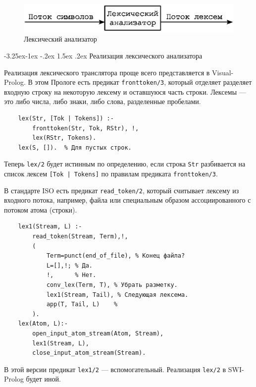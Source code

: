 \documentclass[12pt, openany, twoside]{book} %
\makeatletter
\renewcommand\subsubsection{\@startsection{subsubsection}{3}{\z@}%
                                     {-3.25ex\@plus -1ex \@minus -.2ex}%
                                     {1.5ex \@plus .2ex}%
                                     {\normalfont\normalsize\bfseries}}
\makeatother
\begin{document}
\begin{figure}[htbp]
\begin{center}
\includegraphics[scale=0.7]{pics/lex_anal.eps}
\end{center}
\caption{Лексический анализатор}\label{pic:lex_anal}
\end{figure}

\subsubsection{Реализация лексического анализатора}


Реализация лексического транслятора проще всего представляется в Visual-Prolog. В этом Прологе есть предикат {\tt fronttoken/3}, который отделяет разделяет входную строку на некоторую лексему и оставшуюся часть строки. Лексемы --- это либо числа, либо знаки, либо слова, разделенные пробелами.
{\tt\begin{verbatim}
    lex(Str, [Tok | Tokens]) :-
        fronttoken(Str, Tok, RStr), !,
        lex(RStr, Tokens).
    lex(S, []).  % Для пустых строк.
\end{verbatim}}
\noindent Теперь {\tt lex/2} будет истинным по определению, если строка {\tt Str} разбивается на список лексем {\tt [Tok | Tokens]} по правилам предиката {\tt fronttoken/3}.

В стандарте ISO есть предикат \texttt{read\_token/2}, который считывает лексему из входного потока, например, файла или специальным образом ассоциированного с потоком атома (строки).
{\tt\begin{verbatim}
    lex1(Stream, L) :-
        read_token(Stream, Term),!,
        (
            Term=punct(end_of_file), % Конец файла?
            L=[],!; % Да.
            !,      % Нет.
            conv_lex(Term, T), % Убрать разметку.
            lex1(Stream, Tail), % Следующая лексема.
            app(T, Tail, L)    %
        ).
    lex(Atom, L):-
        open_input_atom_stream(Atom, Stream),
        lex1(Stream, L),
        close_input_atom_stream(Stream).
\end{verbatim}}
В этой версии предикат \texttt{lex1/2} --- вспомогательный. Реализация \texttt{lex/2} в SWI-Prolog будет иной.
\end{document}
